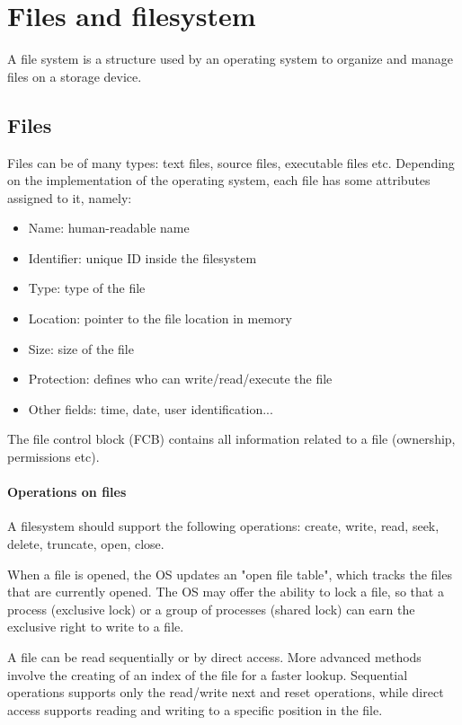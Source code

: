 \chapter{Files and filesystem}
A file system is a structure used by an operating system to organize and manage files on a storage device.

\section{Files}
Files can be of many types: text files, source files, executable files etc. Depending on the implementation of the operating system, each file has some attributes assigned to it, namely:
\begin{itemize}
    \item Name: human-readable name
    \item Identifier: unique ID inside the filesystem
    \item Type: type of the file
    \item Location: pointer to the file location in memory
    \item Size: size of the file
    \item Protection: defines who can write/read/execute the file
    \item Other fields: time, date, user identification...
\end{itemize}

The file control block (FCB) contains all information related to a file (ownership, permissions etc).

\subsubsection{Operations on files}
A filesystem should support the following operations: create, write, read, seek, delete, truncate, open, close.

When a file is opened, the OS updates an "open file table", which tracks the files that are currently opened. The OS may offer the ability to lock a file, so that a process (exclusive lock) or a group of processes (shared lock) can earn the exclusive right to write to a file.

A file can be read sequentially or by direct access. More advanced methods involve the creating of an index of the file for a faster lookup. Sequential operations supports only the read/write next and reset operations, while direct access supports reading and writing to a specific position in the file.

